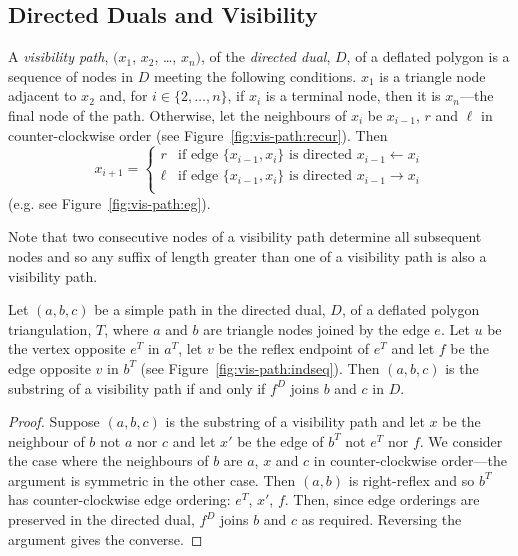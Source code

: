 \documentclass{patmorin}
\begin{document}

\subsection{Directed Duals and Visibility}

A \emph{visibility path}, $(x_1$, $x_2$, \ldots, $x_n)$, of
the \emph{directed dual}, $D$, of a deflated polygon is a sequence of
nodes in $D$ meeting the following conditions.  $x_1$ is a triangle
node adjacent to $x_2$ and, for $i\in\{2,\ldots,n\}$, if $x_i$ is a
terminal node, then it is $x_n$---the final node of the path.
Otherwise, let the neighbours of $x_i$ be $x_{i-1}$, $r$ and $\ell$ in
counter-clockwise order (see Figure~\ref{fig:vis-path:recur}).  Then
\[ x_{i+1} = 
\begin{cases}
  r & \text{if edge $\{x_{i-1}, x_i\}$ is directed $x_{i-1}\leftarrow x_i$} \\
  \ell & \text{if edge $\{x_{i-1}, x_i\}$ is directed $x_{i-1}\rightarrow x_i$} \\
\end{cases}
\]
(e.g. see Figure~\ref{fig:vis-path:eg}).

\iffullversion
Note that two consecutive nodes of a visibility path determine all
subsequent nodes and so any suffix of length greater than one of a
visibility path is also a visibility path.
\fi

\begin{lemma}
  \label{lem:vis-path-geom}
  Let $(a,b,c)$ be a simple path in the directed dual, $D$, of a
  deflated polygon triangulation, $T$, where $a$ and $b$ are triangle
  nodes joined by the edge $e$.  Let $u$ be the vertex opposite $e^T$
  in $a^T$, let $v$ be the reflex endpoint of $e^T$ and let $f$ be the
  edge opposite $v$ in $b^T$ (see Figure~\ref{fig:vis-path:indseq}).
  Then $(a,b,c)$ is the substring of a visibility path if and only if
  $f^D$ joins $b$ and $c$ in $D$.
\end{lemma}
\begin{proof}
  Suppose $(a,b,c)$ is the substring of a visibility path and let $x$
  be the neighbour of $b$ not $a$ nor $c$ and let $x'$ be the edge of
  $b^T$ not $e^T$ nor $f$. We consider the case where the neighbours
  of $b$ are $a$, $x$ and $c$ in counter-clockwise order---the
  argument is symmetric in the other case.  Then $(a,b)$ is
  right-reflex and so $b^T$ has counter-clockwise edge ordering:
  $e^T$, $x'$, $f$.  Then, since edge orderings are preserved in the
  directed dual, $f^D$ joins $b$ and $c$ as required.  Reversing the
  argument gives the converse.
\end{proof}
\end{document}

